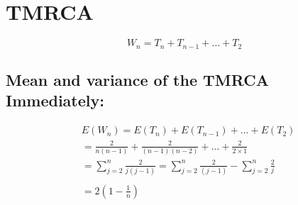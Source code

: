 \documentclass{article}
\begin{document}
\section{TMRCA}

$$
W_n=T_n+T_{n-1}+\ldots+T_2
$$
\subsection{Mean and variance of the TMRCA Immediately:}
$$
\begin{aligned}
& E\left(W_n\right)=E\left(T_n\right)+E\left(T_{n-1}\right)+\ldots+E\left(T_2\right) \\
&=\frac{2}{n(n-1)}+\frac{2}{(n-1)(n-2)}+\ldots+\frac{2}{2 \times 1} \\
& =\sum_{j=2}^n \frac{2}{j(j-1)}=\sum_{j=2}^n \frac{2}{(j-1)}-\sum_{j=2}^n \frac{2}{j} \\
&  \\
&=2\left(1-\frac{1}{n}\right)
\end{aligned}
$$
\end{document}
